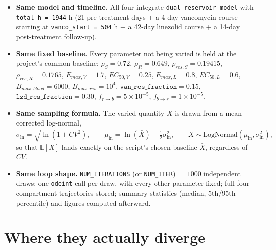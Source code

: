 \documentclass[11pt]{article}
\begin{document}
\begin{itemize}
\item \textbf{Same model and timeline.} All four integrate
\texttt{dual\_reservoir\_model} with \texttt{total\_h = 1944} h
(21 pre-treatment days + a 4-day vancomycin course starting at
\texttt{vanco\_start = 504} h + a 42-day linezolid course + a 14-day
post-treatment follow-up).
\item \textbf{Same fixed baseline.} Every parameter not being varied is held
at the project's common baseline: $\rho_S = 0.72$, $\rho_R = 0.649$,
$\rho_{res,S} = 0.19415$, $\rho_{res,R} = 0.1765$, $E_{max,V} = 1.7$,
$EC_{50,V} = 0.25$, $E_{max,L} = 0.8$, $EC_{50,L} = 0.6$,
$B_{max,blood} = 6000$, $B_{max,res} = 10^4$,
$\mathtt{van\_res\_fraction} = 0.15$, $\mathtt{lzd\_res\_fraction} = 0.30$,
$f_{r\to b} = 5\times10^{-5}$, $f_{b\to r} = 1\times10^{-5}$.
\item \textbf{Same sampling formula.} The varied quantity $X$ is drawn from a
mean-corrected log-normal,
\begin{equation}
\sigma_{\ln} = \sqrt{\ln(1+CV^2)}, \qquad
\mu_{\ln} = \ln(\bar X) - \tfrac{1}{2}\sigma_{\ln}^2, \qquad
X \sim \mathrm{LogNormal}(\mu_{\ln}, \sigma_{\ln}^2),
\end{equation}
so that $\mathbb{E}[X]$ lands exactly on the script's chosen baseline
$\bar X$, regardless of $CV$.
\item \textbf{Same loop shape.} \texttt{NUM\_ITERATIONS} (or
\texttt{NUM\_ITER}) $= 1000$ independent draws; one \texttt{odeint} call per
draw, with every other parameter fixed; full four-compartment trajectories
stored; summary statistics (median, 5th/95th percentile) and figures
computed afterward.
\end{itemize}

\section{Where they actually diverge}
\label{sec:differences}
\end{document}
